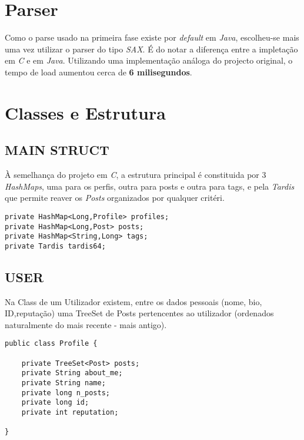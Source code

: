 \section{Parser}

Como o parse usado na primeira fase existe por \textit{default} em \textit{Java}, escolheu-se mais uma vez utilizar o parser do tipo \textit{SAX}.
É do notar a diferença entre a impletação em \textit{C} e em \textit{Java}. Utilizando uma implementação análoga do projecto original, o tempo de load aumentou cerca de \textbf{6 milisegundos}.


\section{Classes e Estrutura}

\subsection{MAIN STRUCT}
À semelhança do projeto em \textit{C}, a estrutura principal é constituida por 3 \textit{HashMaps}, uma para os perfis, outra para posts e outra para tags, e pela \textit{Tardis} que permite reaver os \textit{Posts} organizados por qualquer critéri.
\newline
\begin{lstlisting}
private HashMap<Long,Profile> profiles;
private HashMap<Long,Post> posts;
private HashMap<String,Long> tags;
private Tardis tardis64;
\end{lstlisting}

\subsection{USER}

Na Class de um Utilizador existem, entre os dados pessoais (nome, bio, ID,reputação) uma TreeSet de Posts
pertencentes ao utilizador (ordenados naturalmente do mais recente - mais antigo).

\begin{lstlisting}
public class Profile {

    private TreeSet<Post> posts;
    private String about_me;
    private String name;
    private long n_posts;
    private long id;
    private int reputation;

}
\end{lstlisting}


